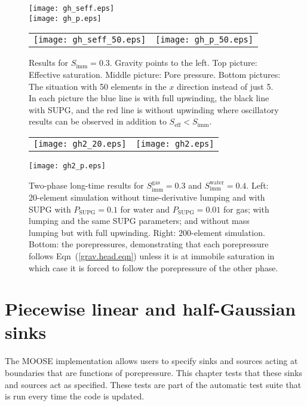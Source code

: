 \documentclass[]{scrreprt}
\begin{document}
\begin{figure}[htb]
\centering
\texttt{[image: gh\_seff.eps]} \\
$\mbox{}$ \\
\texttt{[image: gh\_p.eps]} \\
$\mbox{}$ \\
\begin{tabular}{cc}
\texttt{[image: gh\_seff\_50.eps]} &
\texttt{[image: gh\_p\_50.eps]}
\end{tabular}
\caption{Results for $S_{\mathrm{imm}}=0.3$.  Gravity points to the
  left.  Top picture: Effective saturation.  Middle picture: Pore
  pressure.  Bottom pictures: The situation with 50 elements in the
  $x$ direction instead of just 5.  In each picture the blue line is
  with full upwinding, the black line with SUPG, and the red line is
  without upwinding where oscillatory results can be observed in addition to
  $S_{\mathrm{eff}}< S_{\mathrm{imm}}$.}
\label{gh.fig}
\end{figure}

\begin{figure}[htb]
\centering
\begin{tabular}{cc}
\texttt{[image: gh2\_20.eps]} &
\texttt{[image: gh2.eps]}
\end{tabular}
\texttt{[image: gh2\_p.eps]}
\caption{Two-phase long-time results for
  $S^{\mathrm{gas}}_{\mathrm{imm}}=0.3$ and
  $S^{\mathrm{water}}_{\mathrm{imm}}=0.4$.  Left: 20-element
  simulation without time-derivative lumping and with SUPG with
  $P_{\mathrm{SUPG}}=0.1$ for water and $P_{\mathrm{SUPG}}=0.01$ for
  gas; with lumping and the same SUPG parameters; and without mass
  lumping but with full upwinding.  Right: 200-element simulation.
  Bottom: the porepressures, demonstrating that each porepressure
  follows Eqn~(\ref{grav.head.eqn}) unless it is at immobile
  saturation in which case it is forced to follow the porepressure of
  the other phase.}
\label{gh2.fig}
\end{figure}


\chapter{Piecewise linear and half-Gaussian sinks}
\label{si}

The MOOSE implementation allows users to specify sinks and sources
acting at boundaries that are functions of porepressure.  This chapter
tests that these sinks and sources act as specified.  These tests are
part of the automatic test suite that is run every time the code is
updated.
\end{document}
